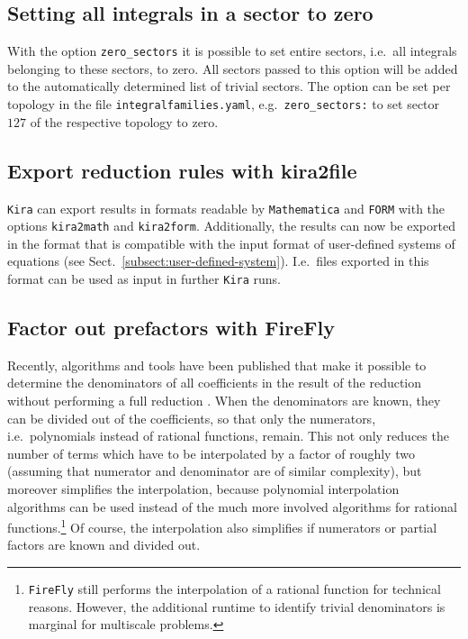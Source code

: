 \documentclass[11pt,a4paper,DIV=11,numbers=noenddot,parskip=half]{scrartcl}
\newcommand{\code}[1]{\texttt{#1}}
\newcommand*{\kira}{\code{Kira}}
\begin{document}
\subsection{Setting all integrals in a sector to zero}
\label{subsect:zero_sectors}

With the option \code{zero\_sectors} it is possible to set entire sectors, i.e.\ all integrals belonging to these sectors, to zero.
All sectors passed to this option will be added to the automatically determined list of trivial sectors.
The option can be set per topology in the file \code{integralfamilies.yaml}, e.g.\ \code{zero\_sectors:\;[b111111100]} to set sector $127$ of the respective topology to zero.


\subsection{Export reduction rules with kira2file}
\label{subsect:kira2file}

\kira{} can export results in formats readable by \code{Mathematica} and \code{FORM} with the options \code{kira2math} and \code{kira2form}.
Additionally, the results can now be exported in the format that is compatible with the input format of user-defined systems of equations (see Sect.~\ref{subsect:user-defined-system}).
I.e.\ files exported in this format can be used as input in further \kira{} runs.


\subsection{Factor out prefactors with FireFly}
\label{subsect:factor-prefactors}

Recently, algorithms and tools have been published that make it possible to determine the denominators of all coefficients in the result of the reduction without performing a full reduction \cite{BSMF_1992__120_3_371_0,Smirnov:2020quc,Usovitsch:2020jrk}.
When the denominators are known, they can be divided out of the coefficients, so that only the numerators, i.e.\ polynomials instead of rational functions, remain.
This not only reduces the number of terms which have to be interpolated by a factor of roughly two (assuming that numerator and denominator are of similar complexity), but moreover simplifies the interpolation, because polynomial interpolation algorithms can be used instead of the much more involved algorithms for rational functions.\footnote{\code{FireFly} still performs the interpolation of a rational function for technical reasons. However, the additional runtime to identify trivial denominators is marginal for multiscale problems.}
Of course, the interpolation also simplifies if numerators or partial factors are known and divided out.
\end{document}
